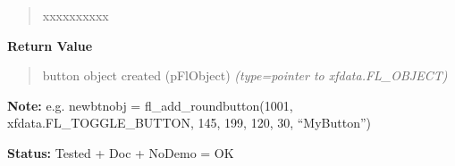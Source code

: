 \begin{boxedminipage}{\funcwidth}
\begin{quote}
\begin{Ventry}{xxxxxxxxxx}
        \end{Ventry}

      \end{quote}

      \textbf{Return Value}
    \vspace{-1ex}

      \begin{quote}

button object created (pFlObject)
      {\it (type=pointer to xfdata.FL\_OBJECT)}

      \end{quote}

\textbf{Note:} 
e.g. newbtnobj = fl\_add\_roundbutton(1001, xfdata.FL\_TOGGLE\_BUTTON,
145, 199, 120, 30, ``MyButton'')


\textbf{Status:} 
Tested + Doc + NoDemo = OK


    \end{boxedminipage}

    \label{xformslib:flbutton:fl_add_button_class}

    \vspace{0.5ex}

